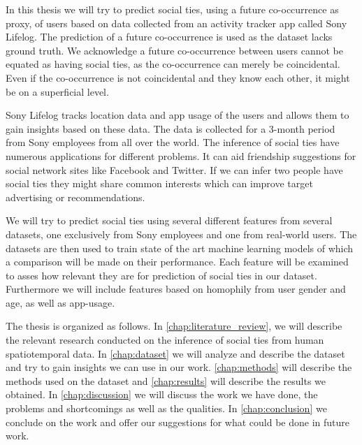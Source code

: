 In this thesis we will try to predict social ties, using a future co-occurrence as proxy, of users based on data collected from an activity tracker app called Sony Lifelog\cite{sonyLifeLog}. The prediction of a future co-occurrence is used as the dataset lacks ground truth. We acknowledge a future co-occurrence between users cannot be equated as having social ties, as the co-occurrence can merely be coincidental. Even if the co-occurrence is not coincidental and they know each other, it might be on a superficial level.

Sony Lifelog tracks location data and app usage of the users and allows them to gain insights based on these data. The data is collected for a 3-month period from Sony employees from all over the world.
The inference of social ties have numerous applications for different problems. It can aid friendship suggestions for social network sites like Facebook and Twitter. If we can infer two people have social ties they might share common interests which can improve target advertising or recommendations\cite{yu2015investigating}.

We will try to predict social ties using several different features from several datasets, one exclusively from Sony employees and one from real-world users. The datasets are then used to train state of the art machine learning models of which a comparison will be made on their performance. Each feature will be examined to asses how relevant they are for prediction of social ties in our dataset. Furthermore we will include features based on homophily\cite{mcpherson2001birds} from user gender and age, as well as app-usage.

The thesis is organized as follows. In \autoref{chap:literature_review}, we will describe the relevant research conducted on the inference of social ties from human spatiotemporal data. In \autoref{chap:dataset} we will analyze and describe the dataset and try to gain insights we can use in our work. \autoref{chap:methods} will describe the methods used on the dataset and \autoref{chap:results} will describe the results we obtained. In \autoref{chap:discussion} we will discuss the work we have done, the problems and shortcomings as well as the qualities. In \autoref{chap:conclusion} we conclude on the work and offer our suggestions for what could be done in future work.


